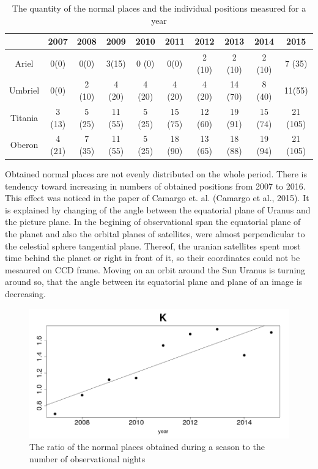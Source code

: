 \documentclass[]{article}
\begin{document}
\begin{table}
\caption{The quantity of the normal places and the individual positions measured for a year}
\label{number_of_points}
\begin{center}
\begin{tabular}{|c|c|c|c|c|c|c|c|c|c|}
\hline
 & 2007 & 2008 & 2009 & 2010 & 2011 & 2012 & 2013 & 2014 & 2015\\
\hline
Ariel & 0(0) & 0(0) & 3(15) & 0 (0) & 0(0) & 2 (10) & 2 (10) & 2 (10) & 7 (35)\\
Umbriel & 0(0) & 2 (10) & 4 (20) & 4 (20) & 4 (20) & 4 (20) & 14 (70) & 8 (40) & 11(55)\\
Titania & 3 (13) & 5 (25) & 11 (55) & 5 (25) & 15 (75) & 12 (60) & 19 (91) & 15 (74) & 21 (105)\\
Oberon & 4 (21) & 7 (35) & 11 (55) & 5 (25) & 18 (90) & 13 (65) & 18 (88) & 19 (94) & 21 (105) \\
\hline
\end{tabular}
\end{center}
\end{table}
Obtained normal places are not evenly distributed on the whole period. There is tendency toward increasing in numbers of obtained positions from 2007 to 2016. This effect was noticed in the paper of Camargo et. al. (Camargo et al., 2015). It is explained by changing of the angle between the equatorial plane of Uranus and the picture plane. In the begining of observational span the equatorial plane of the planet and also the orbital planes of satellites, were almost perpendicular to the celestial sphere tangential plane. Thereof, the uranian satellites spent most time behind the planet or right in front of it, so their coordinates could not be mesaured on CCD frame. Moving on an orbit around the Sun Uranus is turning around so, that the angle between its equatorial plane and plane of an image is decreasing.
\begin{figure} 
\vspace{-4ex}
\includegraphics[width=\linewidth]{K}
\caption{{\footnotesize The ratio of the normal places obtained during a season to the number of observational nights}}
\label{fig:K}
\end{figure}
\end{document}
